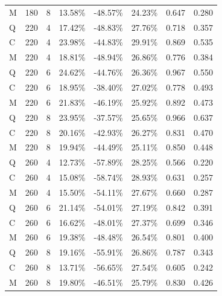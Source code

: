 \begin{longtable}{@{}lrrrrrrr@{}}
M & 180 & 8 & 13.58\% & -48.57\% & 24.23\% & 0.647 & 0.280\\

Q & 220 & 4 & 17.42\% & -48.83\% & 27.76\% & 0.718 & 0.357\\

C & 220 & 4 & 23.98\% & -44.83\% & 29.91\% & 0.869 & 0.535\\

M & 220 & 4 & 18.81\% & -48.94\% & 26.86\% & 0.776 & 0.384\\

Q & 220 & 6 & 24.62\% & -44.76\% & 26.36\% & 0.967 & 0.550\\

C & 220 & 6 & 18.95\% & -38.40\% & 27.02\% & 0.778 & 0.493\\

M & 220 & 6 & 21.83\% & -46.19\% & 25.92\% & 0.892 & 0.473\\

Q & 220 & 8 & 23.95\% & -37.57\% & 25.65\% & 0.966 & 0.637\\

C & 220 & 8 & 20.16\% & -42.93\% & 26.27\% & 0.831 & 0.470\\

M & 220 & 8 & 19.94\% & -44.49\% & 25.11\% & 0.850 & 0.448\\

Q & 260 & 4 & 12.73\% & -57.89\% & 28.25\% & 0.566 & 0.220\\

C & 260 & 4 & 15.08\% & -58.74\% & 28.93\% & 0.631 & 0.257\\

M & 260 & 4 & 15.50\% & -54.11\% & 27.67\% & 0.660 & 0.287\\

Q & 260 & 6 & 21.14\% & -54.01\% & 27.19\% & 0.842 & 0.391\\

C & 260 & 6 & 16.62\% & -48.01\% & 27.37\% & 0.699 & 0.346\\

M & 260 & 6 & 19.38\% & -48.48\% & 26.54\% & 0.801 & 0.400\\

Q & 260 & 8 & 19.16\% & -55.91\% & 26.86\% & 0.787 & 0.343\\

C & 260 & 8 & 13.71\% & -56.65\% & 27.54\% & 0.605 & 0.242\\

M & 260 & 8 & 19.80\% & -46.51\% & 25.79\% & 0.830 & 0.426\\

\end{longtable}\endgroup

